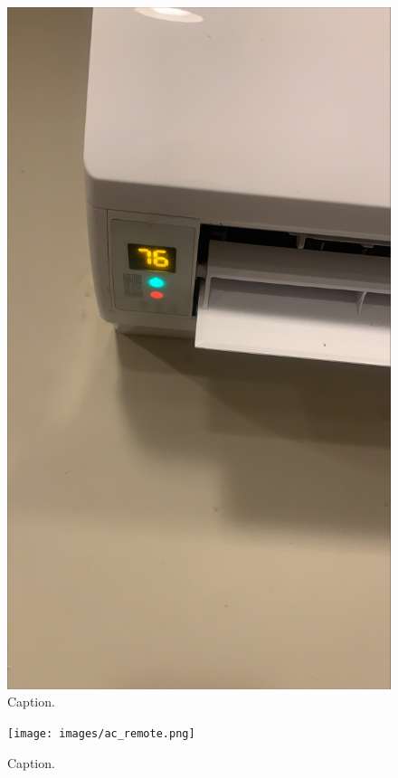 \documentclass{article}
\begin{document}
	\begin{figure}[htbp!]
		\centering
		\includegraphics[scale=0.1]{images/ac.png}
		\caption{Caption.}
		\label{fig:ac}
	\end{figure}

	\begin{figure}[htbp!]
		\centering
		\texttt{[image: images/ac\_remote.png]}
		\caption{Caption.}
		\label{fig:ac_remote}
	\end{figure}
\end{document}
